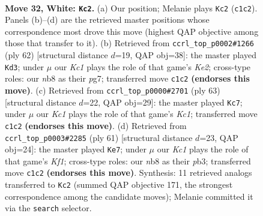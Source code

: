 \documentclass[11pt]{article}
\begin{document}
\clearpage

\begin{figure}[p]\centering
\begin{subfigure}{0.46\textwidth}\centering
\resizebox{\linewidth}{!}{%
\newchessgame
\chessboard[
  setfen={1n5r/5k2/1p1p4/pP1P4/2p5/7P/1P4P1/2K4R w - - 0 32},
  showmover=false,
  pgfstyle=straightmove, color=movearrow, markmove={c1-c2}
]}
\caption{}
\end{subfigure}\hfill
\begin{subfigure}{0.46\textwidth}\centering
\resizebox{\linewidth}{!}{%
\newchessgame
\chessboard[
  setfen={8/2r3p1/8/p2k2p1/6Pp/2P4P/P3KP2/2R5 w - - 1 32},
  showmover=false,
  pgfstyle=straightmove, color=movearrow, markmove={e2-d3}
]}
\caption{}
\end{subfigure}
\\[4pt]
\begin{subfigure}{0.46\textwidth}\centering
\resizebox{\linewidth}{!}{%
\newchessgame
\chessboard[
  setfen={2k1r3/pp6/8/8/P2pp1P1/8/2P2P2/4R1K1 b - - 0 32},
  showmover=false,
  pgfstyle=straightmove, color=movearrow, markmove={c8-c7}
]}
\caption{}
\end{subfigure}\hfill
\begin{subfigure}{0.46\textwidth}\centering
\resizebox{\linewidth}{!}{%
\newchessgame
\chessboard[
  setfen={2r2k2/5pp1/7p/p1p5/P3P2P/1PR5/5KP1/8 b - - 0 31},
  showmover=false,
  pgfstyle=straightmove, color=movearrow, markmove={f8-e7}
]}
\caption{}
\end{subfigure}
\caption{\textbf{Move 32, White: \texttt{Kc2}.} (a) Our position; Melanie plays \texttt{Kc2} (\texttt{c1c2}). Panels (b)--(d) are the retrieved master positions whose correspondence most drove this move (highest QAP objective among those that transfer to it). (b) Retrieved from \texttt{ccrl\_top\_p0002\#1266} (ply 62) [structural distance $d$=19, QAP obj=38]: the master played \texttt{Kd3}; under $\mu$ our \emph{Kc1} plays the role of that game's \emph{Ke2}; cross-type roles: our \emph{n}b8 as their \emph{p}g7; transferred move \texttt{c1c2} \textbf{(endorses this move)}. (c) Retrieved from \texttt{ccrl\_top\_p0000\#2701} (ply 63) [structural distance $d$=22, QAP obj=29]: the master played \texttt{Kc7}; under $\mu$ our \emph{Kc1} plays the role of that game's \emph{Kc1}; transferred move \texttt{c1c2} \textbf{(endorses this move)}. (d) Retrieved from \texttt{ccrl\_top\_p0003\#2285} (ply 61) [structural distance $d$=23, QAP obj=24]: the master played \texttt{Ke7}; under $\mu$ our \emph{Kc1} plays the role of that game's \emph{Kf1}; cross-type roles: our \emph{n}b8 as their \emph{p}b3; transferred move \texttt{c1c2} \textbf{(endorses this move)}. Synthesis: 11 retrieved analogs transferred to \texttt{Kc2} (summed QAP objective 171, the strongest correspondence among the candidate moves); Melanie committed it via the \texttt{search} selector.}
\label{fig:thought-m62}
\end{figure}
\end{document}
